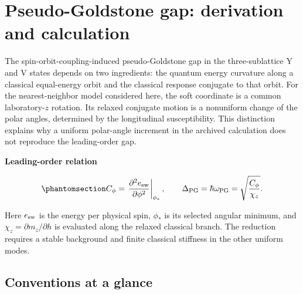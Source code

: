 \clearpage

\section{Pseudo-Goldstone gap: derivation and
calculation}\label{sec-nbcp-gap-appendix}

The spin-orbit-coupling-induced pseudo-Goldstone gap in the
three-sublattice Y and V states depends on two ingredients: the quantum
energy curvature along a classical equal-energy orbit and the classical
response conjugate to that orbit. For the nearest-neighbor model
considered here, the soft coordinate is a common laboratory-\(z\)
rotation. Its relaxed conjugate motion is a nonuniform change of the
polar angles, determined by the longitudinal susceptibility. This
distinction explains why a uniform polar-angle increment in the archived
calculation does not reproduce the leading-order gap.

\begin{tcolorbox}[colback=NotePale,colframe=NoteAccent,boxrule=0pt,leftrule=2pt,arc=0pt]

\textbf{Leading-order relation}

\begin{equation}\phantomsection\label{eq-lswt-yv-pg-gap}{
C_\phi=\left.\frac{\partial^2 e_{\rm sw}}{\partial\phi^2}\right|_{\phi_*},
\qquad
\Delta_{\rm PG}=\hbar\omega_{\rm PG}
=\sqrt{\frac{C_\phi}{\chi_z}}.
}\end{equation}

Here \(e_{\rm sw}\) is the energy per physical spin, \(\phi_*\) is its
selected angular minimum, and \(\chi_z=\partial m_z/\partial h\) is
evaluated along the relaxed classical branch. The reduction requires a
stable background and finite classical stiffness in the other uniform
modes.

\end{tcolorbox}

\subsection*{Conventions at a glance}\label{conventions-at-a-glance}


